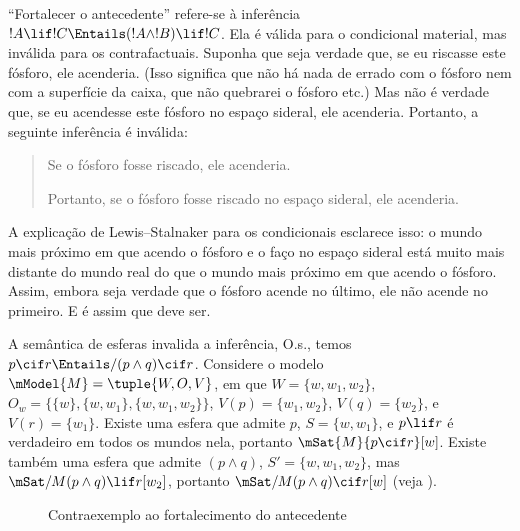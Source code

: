 \documentclass[../../../include/open-logic-section]{subfiles}
\begin{document}


``Fortalecer o antecedente'' refere-se à
inferência $!A \lif !C \Entails (!A \land !B) \lif !C$. Ela é válida
para o condicional material, mas inválida para os contrafactuais. Suponha
que seja verdade que, se eu riscasse este fósforo, ele acenderia. (Isso
significa que não há nada de errado com o fósforo nem com a superfície da caixa,
que não quebrarei o fósforo etc.) Mas não é verdade que, se eu
acendesse este fósforo no espaço sideral, ele acenderia. Portanto, a seguinte
inferência é inválida:
\begin{quote}
  Se o fósforo fosse riscado, ele acenderia.

  Portanto, se o fósforo fosse riscado no espaço sideral, ele acenderia.
\end{quote}

A explicação de Lewis--Stalnaker para os condicionais esclarece isso: o mundo
mais próximo em que acendo o fósforo e o faço no espaço sideral está muito
mais distante do mundo real do que o mundo mais próximo em que
acendo o fósforo. Assim, embora seja verdade que o fósforo acende no
último, ele não acende no primeiro. E é assim que deve ser.

\begin{ex}
  A semântica de esferas invalida a inferência, O.s.\@, temos $p
  \cif r \Entails/ (p \land q) \cif r$. Considere o modelo $\mModel{M}
  = \tuple{W, O, V}$, em que $W = \{w, w_1, w_2\}$, $O_w = \{\{w\}, \{w,
  w_1\}, \{w, w_1, w_2\}\}$, $V(p) = \{w_1, w_2\}$, $V(q) = \{w_2\}$,
  e $V(r) = \{w_1\}$. Existe uma esfera que admite $p$, $S = \{w,
  w_1\}$, e $p \lif r$ é verdadeiro em todos os mundos nela, portanto $\mSat{M}{p
    \cif r}[w]$. Existe também uma esfera que admite $(p \land q)$, $S' =
  \{w, w_1, w_2\}$, mas $\mSat/{M}{(p \land q) \lif r}[w_2]$, portanto
  $\mSat/{M}{(p \land q) \cif r}[w]$ (veja ).

\begin{figure}
\begin{center}
\caption{Contraexemplo ao fortalecimento do antecedente}
\end{center}
\end{figure}
\end{ex}
\end{document}

